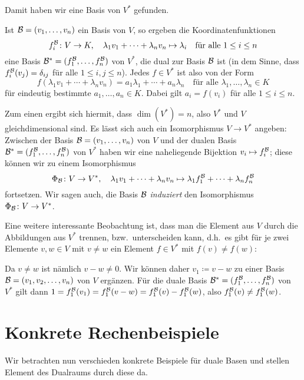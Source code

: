 \documentclass[a4paper,10pt]{article}
\begin{document}
Damit haben wir eine Basis von $V^*$ gefunden.

\begin{shaded}
 Ist $\mathcal{B} = (v_1, \dotsc, v_n)$ ein Basis von $V$, so ergeben die Koordinatenfunktionen
 \[
  f^{\mathcal{B}}_i \colon V \to K, \quad \lambda_1 v_1 + \dotsb + \lambda_n v_n \mapsto \lambda_i
  \quad
  \text{für alle $1 \leq i \leq n$}
 \]
 eine Basis $\mathcal{B}^* = (f^{\mathcal{B}}_1, \dotsc, f^{\mathcal{B}}_n)$ von $V^*$, die dual zur Basis $\mathcal{B}$ ist (in dem Sinne, dass $f^{\mathcal{B}}_i(v_j) = \delta_{ij}$ für alle $1 \leq i,j \leq n$). Jedes $f \in V^*$ ist also von der Form
 \[
  f(\lambda_1 v_1 + \dotsb + \lambda_n v_n)
  = a_1 \lambda_1 + \dotsb + a_n \lambda_n
  \quad
  \text{für alle $\lambda_1, \dotsc, \lambda_n \in K$}
 \]
 für eindeutig bestimmte $a_1, \dotsc, a_n \in K$. Dabei gilt $a_i = f(v_i)$ für alle $1 \leq i \leq n$.
\end{shaded}

Zum einen ergibt sich hiermit, dass $\dim(V^*) = n$, also $V^*$ und $V$ gleichdimensional sind. Es lässt sich auch ein Isomorphismus $V \to V^*$ angeben: Zwischen der Basis $\mathcal{B} = (v_1, \dotsc, v_n)$ von $V$ und der dualen Basis $\mathcal{B}^* = (f^{\mathcal{B}}_1, \dotsc, f^{\mathcal{B}}_n)$ von $V^*$ haben wir eine naheliegende Bijektion $v_i \mapsto f^{\mathcal{B}}_i$; diese können wir zu einem Isomorphismus
\[
 \Phi_{\mathcal{B}} \colon V \to V^*,
 \quad
 \lambda_1 v_1 + \dotsb + \lambda_n v_n
 \mapsto
 \lambda_1 f^{\mathcal{B}}_1 + \dotsb + \lambda_n f^{\mathcal{B}}_n
\]
fortsetzen. Wir sagen auch, die Basis $\mathcal{B}$ \emph{induziert} den Isomorphismus $\Phi_{\mathcal{B}} \colon V \to V^*$.

Eine weitere interessante Beobachtung ist, dass man die Element aus $V$ durch die Abbildungen aus $V^*$ trennen, bzw.\ unterscheiden kann, d.h.\ es gibt für je zwei Elemente $v,w \in V$ mit $v \neq w$ ein Element $f \in V^*$ mit $f(v) \neq f(w)$:

Da $v \neq w$ ist nämlich $v-w \neq 0$. Wir können daher $v_1 \coloneqq v-w$ zu einer Basis $\mathcal{B} = (v_1, v_2, \dotsc, v_n)$ von $V$ ergänzen. Für die duale Basis $\mathcal{B}^* = (f^{\mathcal{B}}_1, \dotsc, f^{\mathcal{B}}_n)$ von $V^*$ gilt dann $1 = f^{\mathcal{B}}_1(v_1) = f^{\mathcal{B}}_1(v-w) = f^{\mathcal{B}}_1(v) - f^{\mathcal{B}}_1(w)$, also $f^{\mathcal{B}}_1(v) \neq f^{\mathcal{B}}_1(w)$.










\section{Konkrete Rechenbeispiele}
Wir betrachten nun verschieden konkrete Beispiele für duale Basen und stellen Element des Dualraums durch diese da.
\end{document}

